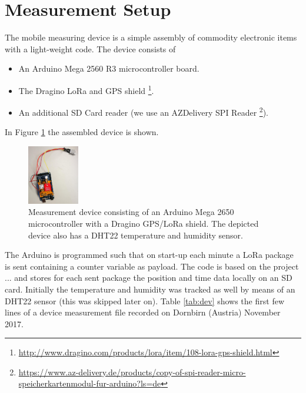 \section{Measurement Setup}\label{sec:setup}

The mobile measuring device is a simple assembly of commodity electronic items with a light-weight code. The device consists of
\begin{itemize}
\item An Arduino Mega 2560 R3 microcontroller board.
\item The Dragino LoRa and GPS shield \footnote{\url{http://www.dragino.com/products/lora/item/108-lora-gps-shield.html}}.
\item An additional SD Card reader (we use an AZDelivery SPI Reader \footnote{\url{https://www.az-delivery.de/products/copy-of-spi-reader-micro-speicherkartenmodul-fur-arduino?ls=de}}).
\end{itemize}
In Figure \ref{fig:device} the assembled device is shown. 

\begin{figure}[h!]\label{fig:device}
\centering
\includegraphics[width=0.2\textwidth]{figures/device}
\caption{Measurement device consisting of an Arduino Mega 2650 microcontroller with a Dragino GPS/LoRa shield. The depicted device also has a DHT22 temperature and humidity sensor.}
\end{figure}

The Arduino is programmed such that on start-up each minute a LoRa package is sent containing a counter variable as payload. The code is based on the project ... and stores for each sent package the position and time data locally on an SD card. Initially the temperature and humidity was tracked as well by means of an DHT22 sensor (this was skipped later on). Table \ref{tab:dev} shows the first few lines of a device measurement file recorded on Dornbirn (Austria) November 2017. 

